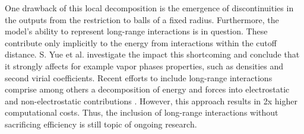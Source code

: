One drawback of this local decomposition is the emergence of discontinuities in the outputs from the restriction to balls of a fixed radius. Furthermore,
the model's ability to represent long-range interactions is in question. These contribute only implicitly to the energy from interactions within the cutoff distance. S. Yue et al. \cite{article} investigate the impact this shortcoming and conclude that it strongly affects for example vapor phases properties, such as densities and second virial coefficients. Recent efforts to include long-range interactions comprise among others a decomposition of energy and forces into electrostatic and non-electrostatic contributions \cite{article}. However, this approach results in 2x higher computational costs. Thus, the inclusion of long-range interactions without sacrificing efficiency is still topic of ongoing research. 